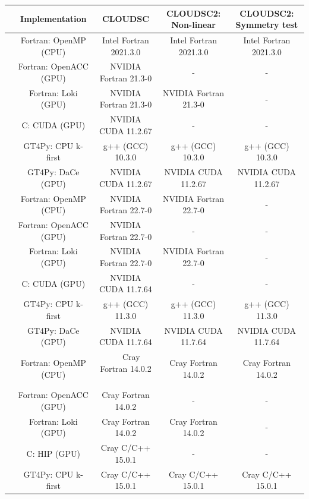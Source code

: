 \documentclass[gmd,manuscript,online]{copernicus}
\theoremstyle{theorem}
\theoremstyle{definition}
\theoremstyle{remark}
\theoremstyle{proposition}
\begin{document}
	\begin{table}[t!]
		\renewcommand{\arraystretch}{1.4}
		\centering
		\begin{footnotesize}
			\begin{tabular}{|c|c|c|c|c|}
				\hline
				& \textbf{Implementation} & \textbf{CLOUDSC} & \textbf{CLOUDSC2: Non-linear} & \textbf{CLOUDSC2: Symmetry test} \\
				\hline
				\multirow{6}{*}{\rotatebox[origin=c]{90}{\textbf{Piz Daint}}} & Fortran: OpenMP (CPU) & Intel Fortran 2021.3.0 & Intel Fortran 2021.3.0 & Intel Fortran 2021.3.0 \\
				& Fortran: OpenACC (GPU) & NVIDIA Fortran 21.3-0 & - & - \\
				& Fortran: Loki (GPU) & NVIDIA Fortran 21.3-0 & NVIDIA Fortran 21.3-0 & - \\
				& C: CUDA (GPU) & NVIDIA CUDA 11.2.67 & - & - \\
				& GT4Py: CPU k-first & g++ (GCC) 10.3.0 & g++ (GCC) 10.3.0 & g++ (GCC) 10.3.0 \\
				& GT4Py: DaCe (GPU) & NVIDIA CUDA 11.2.67 & NVIDIA CUDA 11.2.67 & NVIDIA CUDA 11.2.67 \\
				\hline
				\multirow{6}{*}{\rotatebox[origin=c]{90}{\textbf{MeluXina}}} & Fortran: OpenMP (CPU) & NVIDIA Fortran 22.7-0 & NVIDIA Fortran 22.7-0 & - \\
				& Fortran: OpenACC (GPU) & NVIDIA Fortran 22.7-0 & - & - \\
				& Fortran: Loki (GPU) & NVIDIA Fortran 22.7-0 & NVIDIA Fortran 22.7-0 & - \\
				& C: CUDA (GPU) & NVIDIA CUDA 11.7.64 & - & - \\
				& GT4Py: CPU k-first & g++ (GCC) 11.3.0 & g++ (GCC) 11.3.0 & g++ (GCC) 11.3.0 \\
				& GT4Py: DaCe (GPU) & NVIDIA CUDA 11.7.64 & NVIDIA CUDA 11.7.64 & NVIDIA CUDA 11.7.64 \\
				\hline
				\multirow{6}{*}{\rotatebox[origin=c]{90}{\textbf{LUMI}}} & Fortran: OpenMP (CPU) & ~~ Cray Fortran 14.0.2 ~~ & Cray Fortran 14.0.2 & Cray Fortran 14.0.2 \\
				& Fortran: OpenACC (GPU) & Cray Fortran 14.0.2 & - & - \\
				& Fortran: Loki (GPU) & Cray Fortran 14.0.2 & Cray Fortran 14.0.2 & - \\
				& C: HIP (GPU) & Cray C/C++ 15.0.1 & - & - \\
				& GT4Py: CPU k-first & Cray C/C++ 15.0.1 & Cray C/C++ 15.0.1 & Cray C/C++ 15.0.1 \\

\end{tabular}
\end{footnotesize}
\end{table}
\end{document}
